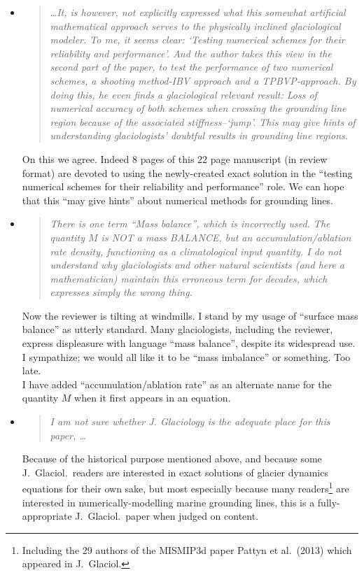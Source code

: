 \documentclass[11pt,reqno]{amsart}
\newcommand{\reply}[2]{
\medskip\medskip
\item  \begin{quote}
\emph{#1}
\end{quote}

\medskip
\noindent #2}
\begin{document}
\begin{itemize}
\reply{\dots It, is however, not explicitly expressed what this somewhat artificial mathematical approach serves to the physically inclined glaciological modeler. To me, it seems clear: `Testing numerical schemes for their reliability and performance'. And the author takes this view in the second part of the paper, to test the performance of two numerical schemes, a shooting method-IBV approach and a TPBVP-approach. By doing this, he even finds a glaciological relevant result: Loss of numerical accuracy of both schemes when crossing the grounding line region because of the associated stiffness--`jump'.  This may give hints of understanding glaciologists' doubtful results in grounding line regions.}
{On this we agree.  Indeed 8 pages of this 22 page manuscript (in review format) are devoted to using the newly-created exact solution in the ``testing numerical schemes for their reliability and performance'' role.  We can hope that this ``may give hints'' about numerical methods for grounding lines.}

\reply{There is one term ``Mass balance'', which is incorrectly used. The quantity $M$ is NOT a mass BALANCE, but an accumulation/ablation rate density, functioning as a climatological input quantity. I do not understand why glaciologists and other natural scientists (and here a mathematician) maintain this erroneous term for decades, which expresses simply the wrong thing.}
{Now the reviewer is tilting at windmills.  I stand by my usage of ``surface mass balance'' as utterly standard.  Many glaciologists, including the reviewer, express displeasure with language ``mass balance'', despite its widespread use.  I sympathize; we would all like it to be ``mass imbalance'' or something.  Too late. \medskip \\
I have added ``accumulation/ablation rate'' as an alternate name for the quantity $M$ when it first appears in an equation.}

\reply{I am not sure whether J. Glaciology is the adequate place for this paper, \dots}
{Because of the historical purpose mentioned above, and because some J.~Glaciol.~readers are interested in exact solutions of glacier dynamics equations for their own sake, but most especially because many readers\footnote{  Including the 29 authors of the MISMIP3d paper Pattyn et al.~(2013) which appeared in J.~Glaciol.} are interested in numerically-modelling marine grounding lines, this is a fully-appropriate J.~Glaciol.~paper when judged on content.}


\end{itemize}
\end{document}
